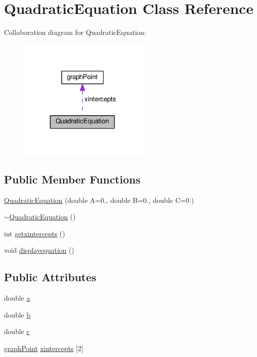 \hypertarget{classQuadraticEquation}{}\section{Quadratic\+Equation Class Reference}
\label{classQuadraticEquation}


Collaboration diagram for Quadratic\+Equation\+:
\nopagebreak
\begin{figure}[H]
\begin{center}
\leavevmode
\includegraphics[width=181pt]{classQuadraticEquation__coll__graph}
\end{center}
\end{figure}
\subsection*{Public Member Functions}
\begin{DoxyCompactItemize}
\item 
\hyperlink{classQuadraticEquation_a3d5ca7fc85ff97aa3bd58f8c34e086b8}{Quadratic\+Equation} (double A=0., double B=0., double C=0.)
\item 
\hyperlink{classQuadraticEquation_a16dcf4de9fb30312e2d5b19c9e30eb00}{$\sim$\+Quadratic\+Equation} ()
\item 
int \hyperlink{classQuadraticEquation_afffee8be484997e6b7fb716cfcef1438}{getxintercepts} ()
\item 
void \hyperlink{classQuadraticEquation_a196dc91dd16021f0ba54cc4e2b36da12}{displayequation} ()
\end{DoxyCompactItemize}
\subsection*{Public Attributes}
\begin{DoxyCompactItemize}
\item 
double \hyperlink{classQuadraticEquation_ac75fc269faf1b22dbae9256a67823627}{a}
\item 
double \hyperlink{classQuadraticEquation_a7c3b8208e2d36d576d17bee5a7ce812f}{b}
\item 
double \hyperlink{classQuadraticEquation_a3ea57c6e9d39a8f4ee2b029db6a8e6d8}{c}
\item 
\hyperlink{structgraphPoint}{graph\+Point} \hyperlink{classQuadraticEquation_a5001f513b8982984dd1b2efe43972d37}{xintercepts} \mbox{[}2\mbox{]}
\end{DoxyCompactItemize}


